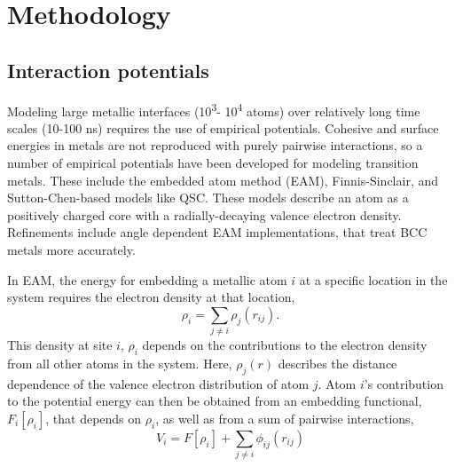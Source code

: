 %

\section{Methodology}
\subsection{Interaction potentials}

Modeling large metallic interfaces (10\textsuperscript{3}-
10\textsuperscript{4} atoms) over relatively long time scales (10-100
ns) requires the use of empirical potentials. Cohesive and surface
energies in metals are not reproduced with purely pairwise
interactions, so a number of empirical potentials have been developed
for modeling transition metals.  These include the embedded atom
method (EAM)\citep{Foiles:1986ky}, Finnis-Sinclair,\citep{Finnis:1984hl} and
Sutton-Chen-based models like QSC.\citep{Goddard:1998qsc} These models describe an
atom as a positively charged core with a radially-decaying valence
electron density.  Refinements include angle dependent EAM
implementations,\citep{Baskes:1987aa} that treat BCC metals more
accurately.

In EAM, the energy for embedding a metallic atom $i$ at a specific
location in the system requires the electron density at that location,
\begin{equation*}
\rho_i = \sum_{j\neq i} \rho_j(r_{ij}).
\end{equation*}
This density at site $i$, $\rho_i$ depends on the contributions to the
electron density from all other atoms in the system.  Here,
$\rho_j(r)$ describes the distance dependence of the valence electron
distribution of atom $j$.  Atom $i$'s contribution to the potential
energy can then be obtained from an embedding functional, $F_i\left[
  \rho_i \right]$, that depends on $\rho_i$, as well as from a sum of
pairwise interactions,
\begin{equation*}
  V_i =  F[ \rho_i ]  + \sum_{j \neq i} \phi_{ij}(r_{ij})
\end{equation*}

